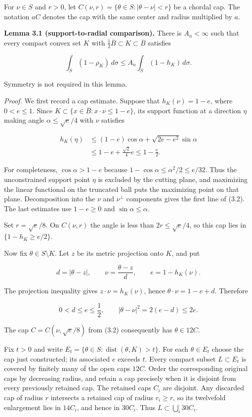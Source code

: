 \documentclass[11pt]{article}
\begin{document}
For \(\nu\in S\) and \(r>0\), let
\(C(\nu,r)=\{\theta\in S:|\theta-\nu|<r\}\) be a chordal cap. The
notation \(aC\) denotes the cap with the same center and radius
multiplied by \(a\).

\textbf{Lemma 3.1 (support-to-radial comparison).} There is
\(A_n<\infty\) such that every compact convex set \(K\) with
\(\tfrac12\overline B\subset K\subset\overline B\) satisfies

\[
\int_S(1-\rho_K)\,d\sigma
\leq A_n\int_S(1-h_K)\,d\sigma.
\tag{3.1}
\]

Symmetry is not required in this lemma.

\emph{Proof.} We first record a cap estimate. Suppose that
\(h_K(\nu)=1-e\), where \(0<e\leq1\). Since
\(K\subset\{x\in\overline B:x\cdot\nu\leq1-e\}\), its support function
at a direction \(\eta\) making angle \(\alpha\leq\sqrt e/4\) with
\(\nu\) satisfies

\[
\begin{aligned}
h_K(\eta)
&\leq(1-e)\cos\alpha+\sqrt{2e-e^2}\sin\alpha\\
&\leq1-e+\frac{\sqrt2}{4}e
\leq1-\frac e2.
\end{aligned}
\tag{3.2}
\]

For completeness, \(\cos\alpha>1-e\) because
\(1-\cos\alpha\leq\alpha^2/2\leq e/32\). Thus the unconstrained support
point \(\eta\) is excluded by the cutting plane, and maximizing the
linear functional on the truncated ball puts the maximizing point on
that plane. Decomposition into the \(\nu\) and \(\nu^\perp\) components
gives the first line of (3.2). The last estimates use \(1-e\geq0\) and
\(\sin\alpha\leq\alpha\).

Set \(r=\sqrt e/8\). On \(C(\nu,r)\) the angle is less than
\(2r\leq\sqrt e/4\), so this cap lies in \(\{1-h_K\geq e/2\}\).

Now fix \(\theta\in S\setminus K\). Let \(z\) be its metric projection
onto \(K\), and put

\[
d=|\theta-z|,\qquad
\nu=\frac{\theta-z}{d},\qquad
e=1-h_K(\nu).
\tag{3.3}
\]

The projection inequality gives \(z\cdot\nu=h_K(\nu)\), hence
\(\theta\cdot\nu=1-e+d\). Therefore

\[
0<d\leq e\leq\frac12,
\qquad
|\theta-\nu|^2=2(e-d)\leq2e.
\tag{3.4}
\]

The cap \(C=C(\nu,\sqrt e/8)\) from (3.2) consequently has
\(\theta\in12C\).

Fix \(t>0\) and write
\(E_t=\{\theta\in S:\operatorname{dist}(\theta,K)>t\}\). For each
\(\theta\in E_t\) choose the cap just constructed; its associated \(e\)
exceeds \(t\). Every compact subset \(L\subset E_t\) is covered by
finitely many of the open caps \(12C\). Order the corresponding original
caps by decreasing radius, and retain a cap precisely when it is
disjoint from every previously retained cap. The retained caps \(C_i\)
are disjoint. Any discarded cap of radius \(r\) intersects a retained
cap of radius \(r_i\geq r\), so its twelvefold enlargement lies in
\(14C_i\), and hence in \(30C_i\). Thus \(L\subset\bigcup_i30C_i\).
\end{document}
